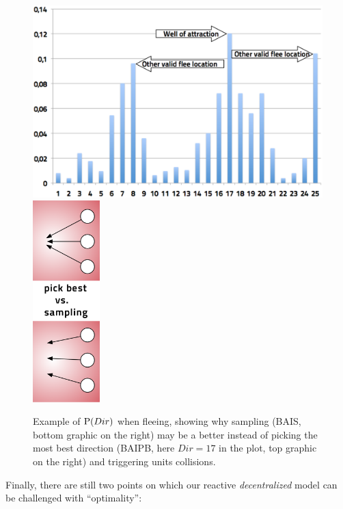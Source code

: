 \begin{figure}[ht]
\includegraphics[width=12cm]{images/distDir.png}
\hspace{0.8cm}
\includegraphics[width=2.6cm]{images/flee_sample.png}
\caption{Example of $\mathrm{P}(Dir)$ when fleeing, showing why sampling (BAIS, bottom graphic on the right) may be a better instead of picking the most best direction (BAIPB, here $Dir=17$ in the plot, top graphic on the right) and triggering units collisions.}
\label{fig:BayesianUnitChoice}
\end{figure}
\label{BayesianUnitCCL}
Finally, there are still two points on which our reactive \textit{decentralized} model can be challenged with ``optimality'':
